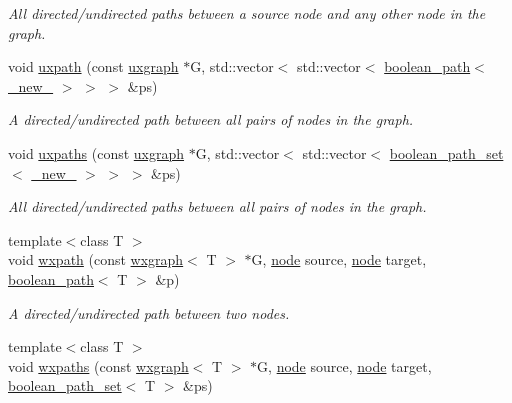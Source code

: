 \begin{DoxyCompactItemize}
\begin{DoxyCompactList}\small\item\em All directed/undirected paths between a source node and any other node in the graph. \end{DoxyCompactList}\item 
void \hyperlink{namespacelgraph_1_1traversal_ac2f98cd03640c664ef13e752bf440180}{uxpath} (const \hyperlink{classlgraph_1_1uxgraph}{uxgraph} $\ast$G, std\+::vector$<$ std\+::vector$<$ \hyperlink{classlgraph_1_1boolean__path}{boolean\+\_\+path}$<$ \hyperlink{namespacelgraph_aa930092705699c3af78e3a4de7880a3f}{\+\_\+new\+\_\+} $>$ $>$ $>$ \&ps)
\begin{DoxyCompactList}\small\item\em A directed/undirected path between all pairs of nodes in the graph. \end{DoxyCompactList}\item 
void \hyperlink{namespacelgraph_1_1traversal_a225d7bc5b36ef1863ad035ce1a8cb83b}{uxpaths} (const \hyperlink{classlgraph_1_1uxgraph}{uxgraph} $\ast$G, std\+::vector$<$ std\+::vector$<$ \hyperlink{namespacelgraph_afad432931ba600ab1628d5c9595986c5}{boolean\+\_\+path\+\_\+set}$<$ \hyperlink{namespacelgraph_aa930092705699c3af78e3a4de7880a3f}{\+\_\+new\+\_\+} $>$ $>$ $>$ \&ps)
\begin{DoxyCompactList}\small\item\em All directed/undirected paths between all pairs of nodes in the graph. \end{DoxyCompactList}\item 
{\footnotesize template$<$class T $>$ }\\void \hyperlink{namespacelgraph_1_1traversal_a2e3286cb7b83c0a47820b1d7256231ab}{wxpath} (const \hyperlink{classlgraph_1_1wxgraph}{wxgraph}$<$ T $>$ $\ast$G, \hyperlink{namespacelgraph_a397169dd66adf725210a30fb7251773e}{node} source, \hyperlink{namespacelgraph_a397169dd66adf725210a30fb7251773e}{node} target, \hyperlink{classlgraph_1_1boolean__path}{boolean\+\_\+path}$<$ T $>$ \&p)
\begin{DoxyCompactList}\small\item\em A directed/undirected path between two nodes. \end{DoxyCompactList}\item 
{\footnotesize template$<$class T $>$ }\\void \hyperlink{namespacelgraph_1_1traversal_af4f6d2630d596387b4ba4891c55a3773}{wxpaths} (const \hyperlink{classlgraph_1_1wxgraph}{wxgraph}$<$ T $>$ $\ast$G, \hyperlink{namespacelgraph_a397169dd66adf725210a30fb7251773e}{node} source, \hyperlink{namespacelgraph_a397169dd66adf725210a30fb7251773e}{node} target, \hyperlink{namespacelgraph_afad432931ba600ab1628d5c9595986c5}{boolean\+\_\+path\+\_\+set}$<$ T $>$ \&ps)

\end{DoxyCompactItemize}
